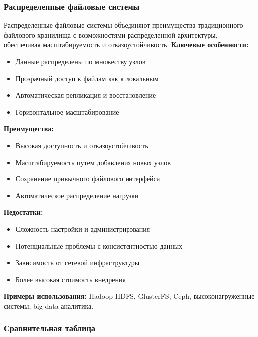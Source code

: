 \subsubsection*{Распределенные файловые системы}
Распределенные файловые системы объединяют преимущества традиционного файлового хранилища с возможностями распределенной архитектуры, обеспечивая масштабируемость и отказоустойчивость.
\textbf{Ключевые особенности:}
\begin{itemize}
\item Данные распределены по множеству узлов
\item Прозрачный доступ к файлам как к локальным
\item Автоматическая репликация и восстановление
\item Горизонтальное масштабирование
\end{itemize}
\textbf{Преимущества:}
\begin{itemize}
\item Высокая доступность и отказоустойчивость
\item Масштабируемость путем добавления новых узлов
\item Сохранение привычного файлового интерфейса
\item Автоматическое распределение нагрузки
\end{itemize}
\textbf{Недостатки:}
\begin{itemize}
\item Сложность настройки и администрирования
\item Потенциальные проблемы с консистентностью данных
\item Зависимость от сетевой инфраструктуры
\item Более высокая стоимость внедрения
\end{itemize}
\textbf{Примеры использования:} Hadoop HDFS, GlusterFS, Ceph, высоконагруженные системы, big data аналитика.
\subsubsection*{Сравнительная таблица}

